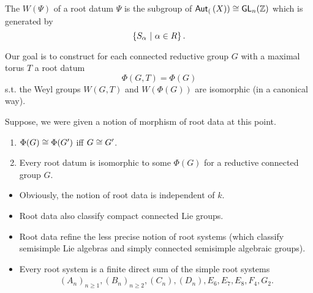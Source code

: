 \begin{definition}
	The  $W(\Psi)$ of a root datum $\Psi$ is the subgroup of $\textsf{Aut}_{(}\left(X\right)) \overset{}{\cong} \textsf{GL}_n(\mathbb{Z})$ which is generated by
	\[ \left\lbrace S_\alpha ~ | ~ \alpha \in R\right\rbrace. \]
\end{definition}


Our goal is to construct for each connected reductive group $G$ with a maximal torus $T$ a root datum
\[ \Phi(G,T) = \Phi(G) \]
s.t. the Weyl groups $W(G,T)$ and $W(\Phi(G))$ are isomorphic (in a canonical way).
\begin{theorem}[Facts]
	Suppose, we were given a notion of morphism of root data at this point.
\begin{enumerate}
\item $\Phi(G) \overset{}{\cong} \Phi(G')$ iff $G \overset{}{\cong} G'$.
\item Every root datum is isomorphic to some $\Phi(G)$ for a reductive connected group $G$.
\end{enumerate}
\end{theorem}
\begin{remark}
	\begin{itemize}
		\item Obviously, the notion of root data is independent of $k$.
		\item Root data also classify compact connected Lie groups.
		\item Root data refine the less precise notion of root systems (which classify semisimple Lie algebras and simply connected semisimple algebraic groups).
		\item Every root system is a finite direct sum of the simple root systems
		\begin{align*}
		(A_n)_{n\geq 1}, (B_n)_{n\geq 2}, (C_n), (D_n), E_6, E_7, E_8, F_4, G_2.
		\end{align*}
	\end{itemize}
\end{remark}